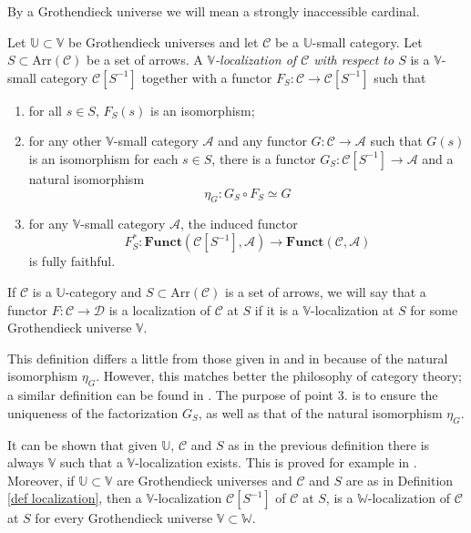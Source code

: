 \begin{refsection}
\begin{rmk}
By a Grothendieck universe we will mean a strongly inaccessible cardinal.
\end{rmk}

\begin{defin} \label{def localization}
Let $\mathbb U \subset \mathbb V$ be Grothendieck universes and let $\mathcal C$ be a $\mathbb U$-small category. Let $S \subset \mathrm{Arr}(\mathcal C)$ be a set of arrows. A \emph{$\mathbb V$-localization of $\mathcal C$ with respect to $S$} is a $\mathbb V$-small category $\mathcal C[S^{-1}]$ together with a functor $F_S \colon \mathcal C \to \mathcal C[S^{-1}]$ such that
\begin{enumerate}
\item for all $s \in S$, $F_S(s)$ is an isomorphism;
\item for any other $\mathbb V$-small category $\mathcal A$ and any functor $G \colon \mathcal C \to \mathcal A$ such that $G(s)$ is an isomorphism for each $s \in S$, there is a functor $G_S \colon \mathcal C[S^{-1}] \to \mathcal A$ and a natural isomorphism
\[
\eta_G \colon G_S \circ F_S \simeq G
\]
\item for any $\mathbb V$-small category $\mathcal A$, the induced functor
\[
F_S^* \colon \mathbf{Funct}(\mathcal C[S^{-1}],\mathcal A) \to \mathbf{Funct}(\mathcal C, \mathcal A)
\]
is fully faithful.
\end{enumerate}
If $\mathcal C$ is a $\mathbb U$-category and $S \subset \mathrm{Arr}(\mathcal C)$ is a set of arrows, we will say that a functor $F \colon \mathcal C \to \mathcal D$ is a localization of $\mathcal C$ at $S$ if it is a $\mathbb V$-localization at $S$ for some Grothendieck universe $\mathbb V$.
\end{defin}

\begin{rmk}
This definition differs a little from those given in \cite{gz} and in \cite{weibel} because of the natural isomorphism $\eta_G$. However, this matches better the philosophy of category theory; a similar definition can be found in \cite[Ch. 7.1]{kashiwara}. The purpose of point 3. is to ensure the uniqueness of the factorization $G_S$, as well as that of the natural isomorphism $\eta_G$.
\end{rmk}

\begin{rmk} \label{remark enlarging universe}
It can be shown that given $\mathbb U$, $\mathcal C$ and $S$ as in the previous definition there is always $\mathbb V$ such that a $\mathbb V$-localization exists. This is proved for example in \cite[I.1]{gz}. Moreover, if $\mathbb U \subset \mathbb V$ are Grothendieck universes and $\mathcal C$ and $S$ are as in Definition \ref{def localization}, then a $\mathbb V$-localization $\mathcal C[S^{-1}]$ of $\mathcal C$ at $S$, is a $\mathbb W$-localization of $\mathcal C$ at $S$ for every Grothendieck universe $\mathbb V \subset \mathbb W$.
\end{rmk}


\end{refsection}
